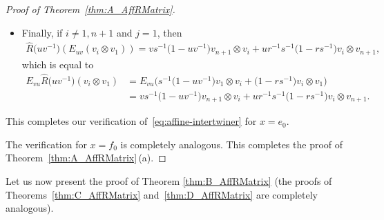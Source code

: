 \documentclass[pdftex]{sigma}
\numberwithin{equation}{section}
\begin{document}
\begin{proof}[Proof of Theorem~\ref{thm:A_AffRMatrix}]
\begin{itemize}
\item
Finally, if $i \neq 1,n + 1$ and $j = 1$, then
\begin{gather*}
 \hat{R}\bigl(uv^{-1}\bigr)(E_{uv}(v_{i} \otimes v_{1})) =
 vs^{-1}\bigl(1 - uv^{-1}\bigr)v_{n+1} \otimes v_{i} + ur^{-1}s^{-1}\bigl(1 - rs^{-1}\bigr)v_{i} \otimes v_{n+1},
\end{gather*}
which is equal to
\begin{displaymath}
\begin{split}
 E_{vu}\hat{R}\bigl(uv^{-1}\bigr)(v_{i} \otimes v_{1})
 & = E_{vu}\bigl(s^{-1}\bigl(1 - uv^{-1}\bigr)v_{1} \otimes v_{i} + \bigl(1 - rs^{-1}\bigr)v_{i} \otimes v_{1}\bigr) \\
 & = vs^{-1}\bigl(1 - uv^{-1}\bigr)v_{n+1} \otimes v_{i} + ur^{-1}s^{-1}\bigl(1 - rs^{-1}\bigr)v_{i} \otimes v_{n+1}.
\end{split}
\end{displaymath}

\end{itemize}
This completes our verification of~\eqref{eq:affine-intertwiner} for $x = e_{0}$.

The verification for $x = f_{0}$ is completely analogous. This completes the proof of Theorem~\ref{thm:A_AffRMatrix}\,(a).
\end{proof}

Let us now present the proof of Theorem \ref{thm:B_AffRMatrix} (the proofs of Theorems~\ref{thm:C_AffRMatrix} and~\ref{thm:D_AffRMatrix} are completely analogous).
\end{document}
